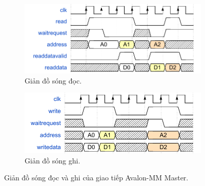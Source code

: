 \begin{itemize}
    \begin{figure}[htbp]
        \centering
        \begin{subfigure}[b]{0.7\textwidth}
            \centering
            \includegraphics[width=\linewidth]{Images/02_05_AvalonMaster_ReadWaveform.pdf}
            \caption{Giản đồ sóng đọc.}
            \label{fig:02_05_avalon_master_read}
        \end{subfigure}
        \hfill
        \begin{subfigure}[b]{0.7\textwidth}
            \centering
            \includegraphics[width=\linewidth]{Images/02_06_AvalonMaster_WriteWaveform.pdf}
            \caption{Giản đồ sóng ghi.}
            \label{fig:02_06_avalon_master_write}
        \end{subfigure}
        \caption{Giản đồ sóng đọc và ghi của giao tiếp Avalon-MM Master.}
        \label{fig:avalon_master_waveforms}
    \end{figure}




\end{itemize}
